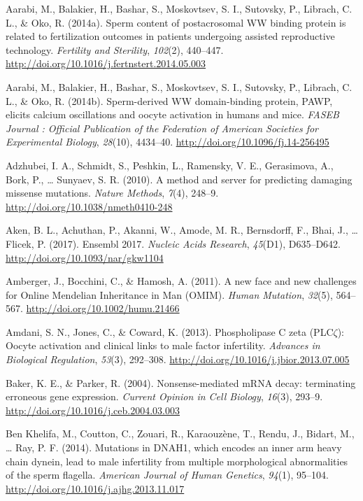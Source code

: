 \documentclass[12pt,twoside]{reedthesis}
\theoremstyle{definition}
\theoremstyle{definition}
\theoremstyle{remark}
\begin{document}
  \hypertarget{ref-Aarabi2014}{}
  Aarabi, M., Balakier, H., Bashar, S., Moskovtsev, S. I., Sutovsky, P.,
  Librach, C. L., \& Oko, R. (2014a). Sperm content of postacrosomal WW
  binding protein is related to fertilization outcomes in patients
  undergoing assisted reproductive technology. \emph{Fertility and
  Sterility}, \emph{102}(2), 440--447.
  \url{http://doi.org/10.1016/j.fertnstert.2014.05.003}
  
  \hypertarget{ref-Aarabi2014a}{}
  Aarabi, M., Balakier, H., Bashar, S., Moskovtsev, S. I., Sutovsky, P.,
  Librach, C. L., \& Oko, R. (2014b). Sperm-derived WW domain-binding
  protein, PAWP, elicits calcium oscillations and oocyte activation in
  humans and mice. \emph{FASEB Journal : Official Publication of the
  Federation of American Societies for Experimental Biology},
  \emph{28}(10), 4434--40. \url{http://doi.org/10.1096/fj.14-256495}
  
  \hypertarget{ref-Adzhubei2010}{}
  Adzhubei, I. A., Schmidt, S., Peshkin, L., Ramensky, V. E., Gerasimova,
  A., Bork, P., \ldots{} Sunyaev, S. R. (2010). A method and server for
  predicting damaging missense mutations. \emph{Nature Methods},
  \emph{7}(4), 248--9. \url{http://doi.org/10.1038/nmeth0410-248}
  
  \hypertarget{ref-Aken2017}{}
  Aken, B. L., Achuthan, P., Akanni, W., Amode, M. R., Bernsdorff, F.,
  Bhai, J., \ldots{} Flicek, P. (2017). Ensembl 2017. \emph{Nucleic Acids
  Research}, \emph{45}(D1), D635--D642.
  \url{http://doi.org/10.1093/nar/gkw1104}
  
  \hypertarget{ref-Amberger2011}{}
  Amberger, J., Bocchini, C., \& Hamosh, A. (2011). A new face and new
  challenges for Online Mendelian Inheritance in Man (OMIM). \emph{Human
  Mutation}, \emph{32}(5), 564--567.
  \url{http://doi.org/10.1002/humu.21466}
  
  \hypertarget{ref-Amdani2013}{}
  Amdani, S. N., Jones, C., \& Coward, K. (2013). Phospholipase C zeta
  (PLC\(\zeta\)): Oocyte activation and clinical links to male factor
  infertility. \emph{Advances in Biological Regulation}, \emph{53}(3),
  292--308. \url{http://doi.org/10.1016/j.jbior.2013.07.005}
  
  \hypertarget{ref-Baker2004}{}
  Baker, K. E., \& Parker, R. (2004). Nonsense-mediated mRNA decay:
  terminating erroneous gene expression. \emph{Current Opinion in Cell
  Biology}, \emph{16}(3), 293--9.
  \url{http://doi.org/10.1016/j.ceb.2004.03.003}
  
  \hypertarget{ref-BenKhelifa2014}{}
  Ben Khelifa, M., Coutton, C., Zouari, R., Karaouzène, T., Rendu, J.,
  Bidart, M., \ldots{} Ray, P. F. (2014). Mutations in DNAH1, which
  encodes an inner arm heavy chain dynein, lead to male infertility from
  multiple morphological abnormalities of the sperm flagella.
  \emph{American Journal of Human Genetics}, \emph{94}(1), 95--104.
  \url{http://doi.org/10.1016/j.ajhg.2013.11.017}
  
\end{document}
